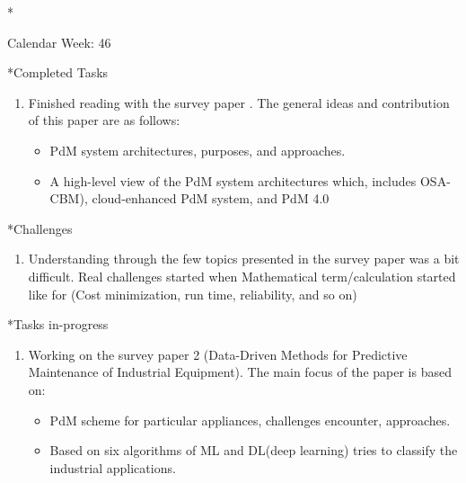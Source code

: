 \documentclass[11pt,a4paper]{article}
\begin{document}
\newpage

\begin{section}*{Calendar Week: 46 \hfill \date{13 November, 2020}}

\begin{subsection}*{Completed Tasks}
    \begin{enumerate}
        \item
            Finished reading with the survey paper \cite{survey1}. The general ideas and contribution of this paper are as follows:
            \begin{itemize}
                \item PdM system architectures, purposes, and approaches.
                \item A high-level view of the PdM system architectures which, includes OSA-CBM), cloud-enhanced PdM system, and PdM 4.0
            \end{itemize}
    \end{enumerate}
\end{subsection}

\begin{subsection}*{Challenges}
    \begin{enumerate}
        \item
            Understanding through the few topics presented in the survey paper \cite{survey1} was a bit difficult. Real challenges started when Mathematical term/calculation started like for (Cost minimization, run time, reliability, and so on)
    \end{enumerate}
\end{subsection}

\begin{subsection}*{Tasks in-progress}
    \begin{enumerate}
        \item
            Working on the survey paper 2 (Data-Driven Methods for Predictive Maintenance of Industrial Equipment)\cite{survey2}. The main focus of the paper is based on:
            \begin{itemize}
            \item PdM scheme for particular appliances, challenges encounter, approaches. 
            \item Based on six algorithms of ML and DL(deep learning) tries to classify the industrial applications. 
            \end{itemize}
    \end{enumerate}
\end{subsection}


\end{section}
\end{document}
